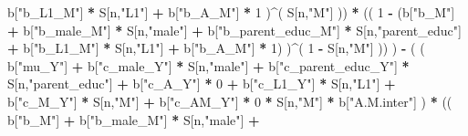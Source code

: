 \documentclass[
]{book}
\newenvironment{Shaded}{\begin{snugshade}}{\end{snugshade}}
\newcommand{\DecValTok}[1]{\textcolor[rgb]{0.00,0.00,0.81}{#1}}
\newcommand{\NormalTok}[1]{#1}
\newcommand{\SpecialCharTok}[1]{\textcolor[rgb]{0.81,0.36,0.00}{\textbf{#1}}}
\newcommand{\StringTok}[1]{\textcolor[rgb]{0.31,0.60,0.02}{#1}}
\begin{document}
\begin{Shaded}
\begin{Highlighting}[]
\NormalTok{                           b[}\StringTok{"b\_L1\_M"}\NormalTok{] }\SpecialCharTok{*}\NormalTok{ S[n,}\StringTok{"L1"}\NormalTok{] }\SpecialCharTok{+}
\NormalTok{                           b[}\StringTok{"b\_A\_M"}\NormalTok{] }\SpecialCharTok{*} \DecValTok{1}\NormalTok{ )}\SpecialCharTok{\^{}}\NormalTok{( S[n,}\StringTok{"M"}\NormalTok{] )) }\SpecialCharTok{*}
\NormalTok{                      (( }\DecValTok{1} \SpecialCharTok{{-}}\NormalTok{ (b[}\StringTok{"b\_M"}\NormalTok{] }\SpecialCharTok{+} 
\NormalTok{                                b[}\StringTok{"b\_male\_M"}\NormalTok{] }\SpecialCharTok{*}\NormalTok{ S[n,}\StringTok{"male"}\NormalTok{] }\SpecialCharTok{+} 
\NormalTok{                                b[}\StringTok{"b\_parent\_educ\_M"}\NormalTok{] }\SpecialCharTok{*}\NormalTok{ S[n,}\StringTok{"parent\_educ"}\NormalTok{] }\SpecialCharTok{+} 
\NormalTok{                                b[}\StringTok{"b\_L1\_M"}\NormalTok{] }\SpecialCharTok{*}\NormalTok{ S[n,}\StringTok{"L1"}\NormalTok{] }\SpecialCharTok{+}
\NormalTok{                                b[}\StringTok{"b\_A\_M"}\NormalTok{] }\SpecialCharTok{*} \DecValTok{1}\NormalTok{) )}\SpecialCharTok{\^{}}\NormalTok{( }\DecValTok{1} \SpecialCharTok{{-}}\NormalTok{ S[n,}\StringTok{"M"}\NormalTok{] )) ) }\SpecialCharTok{{-}} 
\NormalTok{                    ( ( b[}\StringTok{"mu\_Y"}\NormalTok{] }\SpecialCharTok{+} 
\NormalTok{                          b[}\StringTok{"c\_male\_Y"}\NormalTok{] }\SpecialCharTok{*}\NormalTok{ S[n,}\StringTok{"male"}\NormalTok{] }\SpecialCharTok{+} 
\NormalTok{                          b[}\StringTok{"c\_parent\_educ\_Y"}\NormalTok{] }\SpecialCharTok{*}\NormalTok{ S[n,}\StringTok{"parent\_educ"}\NormalTok{] }\SpecialCharTok{+}
\NormalTok{                          b[}\StringTok{"c\_A\_Y"}\NormalTok{] }\SpecialCharTok{*} \DecValTok{0} \SpecialCharTok{+}
\NormalTok{                          b[}\StringTok{"c\_L1\_Y"}\NormalTok{] }\SpecialCharTok{*}\NormalTok{ S[n,}\StringTok{"L1"}\NormalTok{] }\SpecialCharTok{+}
\NormalTok{                          b[}\StringTok{"c\_M\_Y"}\NormalTok{] }\SpecialCharTok{*}\NormalTok{ S[n,}\StringTok{"M"}\NormalTok{] }\SpecialCharTok{+} 
\NormalTok{                          b[}\StringTok{"c\_AM\_Y"}\NormalTok{] }\SpecialCharTok{*} \DecValTok{0} \SpecialCharTok{*}\NormalTok{ S[n,}\StringTok{"M"}\NormalTok{] }\SpecialCharTok{*}\NormalTok{ b[}\StringTok{"A.M.inter"}\NormalTok{] ) }\SpecialCharTok{*}
\NormalTok{                        (( b[}\StringTok{"b\_M"}\NormalTok{] }\SpecialCharTok{+} 
\NormalTok{                             b[}\StringTok{"b\_male\_M"}\NormalTok{] }\SpecialCharTok{*}\NormalTok{ S[n,}\StringTok{"male"}\NormalTok{] }\SpecialCharTok{+} 

\end{Highlighting}
\end{Shaded}
\end{document}
